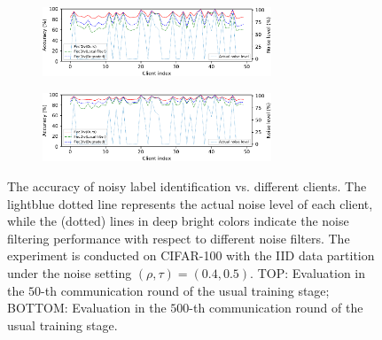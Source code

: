 \documentclass[letterpaper]{article} %
\begin{document}
\begin{figure}[t]
    \centering
    \begin{subfigure}{\textwidth}
        \centering
        \includegraphics[width=0.75\textwidth]{figures/identification_performance_50rnd.pdf}
    \end{subfigure}
    \begin{subfigure}{\textwidth}
        \centering
        \includegraphics[width=0.75\textwidth]{figures/identification_performance_500rnd.pdf}
    \end{subfigure}

    \caption{The accuracy of noisy label identification vs. different clients. 
    The lightblue dotted line represents the actual noise level of each client, while the (dotted) lines in deep bright colors indicate the noise filtering performance with respect to different noise filters. The experiment is conducted on CIFAR-100 with the IID data partition under the noise setting $(\rho, \tau)=(0.4, 0.5)$. TOP: Evaluation in the $50$-th communication round of the usual training stage; BOTTOM: Evaluation in the $500$-th communication round of the usual training stage.}
    \label{Figure:Filtering-Accuracy}
\end{figure}
\end{document}
